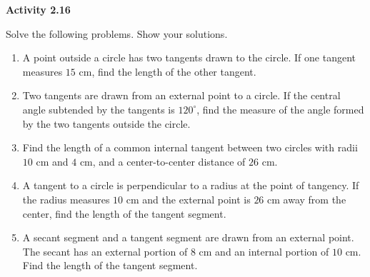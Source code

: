 \vspace{0.3ex}
\noindent\textbf{Activity 2.16}

\vspace{0.2ex}

Solve the following problems. Show your solutions.

\begin{enumerate}
    \item A point outside a circle has two tangents drawn to the circle. If one tangent measures $15$ cm, find the length of the other tangent.
    \item Two tangents are drawn from an external point to a circle. If the central angle subtended by the tangents is $120^\circ$, find the measure of the angle formed by the two tangents outside the circle.
    \item Find the length of a common internal tangent between two circles with radii $10$ cm and $4$ cm, and a center-to-center distance of $26$ cm.
    \item A tangent to a circle is perpendicular to a radius at the point of tangency. If the radius measures $10$ cm and the external point is $26$ cm away from the center, find the length of the tangent segment.
    \item A secant segment and a tangent segment are drawn from an external point. The secant has an external portion of $8$ cm and an internal portion of $10$ cm. Find the length of the tangent segment.
\end{enumerate}

